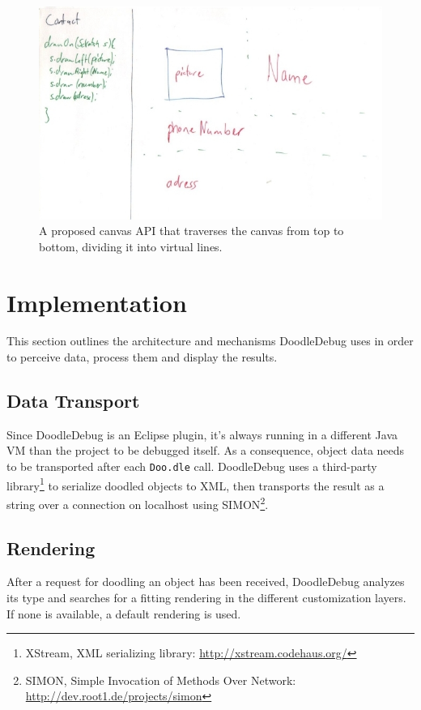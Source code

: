 \documentclass[english]{scrartcl}
\newcommand{\DD}{Dood\-le\-De\-bug\xspace}
\newcommand{\Doodle}{\texttt{Doo.\-dle}\xspace}
\begin{document}
\begin{figure}[h]
	\includegraphics[width=\linewidth]{img/sketches/026.jpg}
	\caption[Bad sketch example: Left-right pattern]{A proposed canvas API that traverses the canvas from top to bottom, dividing it into virtual lines.}
\end{figure}


\section{Implementation}
This section outlines the architecture and mechanisms \DD uses in order to perceive data, process them and display the results.

\subsection{Data Transport}
Since \DD is an Eclipse plugin, it's always running in a different Java VM than the project to be debugged itself.
As a consequence, object data needs to be transported after each \Doodle call.
\DD uses a third-party library\footnote{XStream, XML serializing library: \url{http://xstream.codehaus.org/}} to serialize doodled objects to XML, then transports the result as a string over a connection on localhost using SIMON\footnote{SIMON, Simple Invocation of Methods Over Network: \url{http://dev.root1.de/projects/simon}}.

\subsection{Rendering}
After a request for doodling an object has been received, \DD analyzes its type and searches for a fitting rendering in the different customization layers.
If none is available, a default rendering is used.
\end{document}
